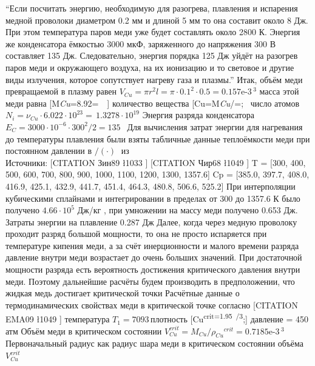 \documentclass[11pt]{article}
\begin{document}
``Если посчитать энергию, необходимую для разогрева, плавления и
испарения медной проволоки диаметром 0.2 мм и длиной 5 мм то она
составит около 8 Дж. При этом температура паров меди уже будет
составлять около 2800 К. Энергия же конденсатора ёмкостью 3000 мкФ,
заряженного до напряжения 300 В составляет 135 Дж. Следовательно,
энергия порядка 125 Дж уйдёт на разогрев паров меди и окружающего
воздуха, на их ионизацию и то световое и другие виды излучения, которое
сопутствует нагреву газа и плазмы.'' Итак, объём меди превращаемой в
плазму равен
\({{V}_{Cu}}=\pi {{r}^{2}}l=\pi \cdot {{0.1}^{2}}\cdot 0.5=\text{0}\text{.157e-3}\, {{}^{3}}\)
масса этой меди равна
{[}{{M}\emph{{Cu}}=8.92=~~{]}
количество вещества
{[}{{\nu }}{Cu}}={{{M}\emph{{Cu}}}/{=};~\text{.22e-4 }{]}
число атомов
\({{N}_{i}}={{\nu }_{Cu}}\cdot 6.022\cdot {{10}^{23}}=\, 1.3278\cdot {{10}^{19}}\)
Энергия разряда конденсатора
\({{E}_{C}}={3000\cdot {{10}^{-6}}\cdot {{300}^{2}}}/{2=135\, }\;\) Для
вычисления затрат энергии для нагревания до температуры плавления были
взяты табличные данные теплоёмкости меди при постоянном давлении в
\({}/{\left( \cdot \right)}\;\) из\\
Источники: {[}CITATION Зин89 \l 1033 {]} {[}CITATION Чир68 \l 1049 {]} T
= {[}300, 400, 500, 600, 700, 800, 900, 1000, 1100, 1200, 1300,
1357.6{]} Cp = {[}385.0, 397.7, 408.0, 416.9, 425.1, 432.9, 441.7,
451.4, 464.3, 480.8, 506.6, 525.2{]} При интерполяции кубическими
сплайнами и интегрировании в пределах от 300 до 1357.6 К было получено
\(4.66\cdot {{10}^{5}}\) Дж/кг , при умножении на массу меди получено
0.653 Дж. Затраты энергии на плавление 0.287 Дж Далее, когда через
медную проволоку проходит разряд большой мощности, то она не просто
испаряется при температуре кипения меди, а за счёт инерционности и
малого времени разряда давление внутри меди возрастает до очень больших
значений. При достаточной мощности разряда есть вероятность достижения
критического давления внутри меди. Поэтому дальнейшие расчёты будем
производить в предположении, что жидкая медь достигает критической точки
Расчётные данные о термодинамических свойствах меди в критической точке
согласно {[}CITATION EMA09 \l 1049 {]} температура
\({{T}_{1}}=7093\, \)плотность
{[}{{\rho }}{Cu}}\textsuperscript{{crit}=1.95~{}/{{{}}{3}}};{]}
давление = 450 атм Объём меди в критическом состоянии
\(V_{Cu}^{crit}={{{M}_{Cu}}}/{{{\rho }_{Cu}}^{crit}=\text{0}\text{.7185e-3}\, {{}^{3}}}\;\)
Первоначальный радиус как радиус шара меди в критическом состоянии
объёма \(V_{Cu}^{crit}\)
\end{document}
